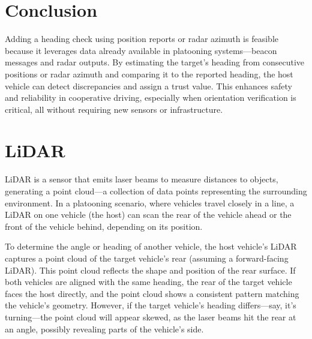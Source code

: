 \documentclass{article}
\begin{document}
\section*{Conclusion}
Adding a heading check using position reports or radar azimuth is feasible because it leverages data already available in platooning systems—beacon messages and radar outputs. By estimating the target's heading from consecutive positions or radar azimuth and comparing it to the reported heading, the host vehicle can detect discrepancies and assign a trust value. This enhances safety and reliability in cooperative driving, especially when orientation verification is critical, all without requiring new sensors or infrastructure.

\section*{LiDAR}


LiDAR is a sensor that emits laser beams to measure distances to objects, generating a point cloud---a collection of data points representing the surrounding environment. In a platooning scenario, where vehicles travel closely in a line, a LiDAR on one vehicle (the host) can scan the rear of the vehicle ahead or the front of the vehicle behind, depending on its position.

To determine the angle or heading of another vehicle, the host vehicle's LiDAR captures a point cloud of the target vehicle's rear (assuming a forward-facing LiDAR). This point cloud reflects the shape and position of the rear surface. If both vehicles are aligned with the same heading, the rear of the target vehicle faces the host directly, and the point cloud shows a consistent pattern matching the vehicle's geometry. However, if the target vehicle's heading differs---say, it's turning---the point cloud will appear skewed, as the laser beams hit the rear at an angle, possibly revealing parts of the vehicle's side.
\end{document}
